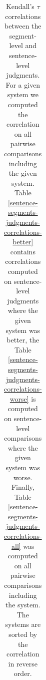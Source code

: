 \begin{table}
\begin{center}
{\begin{tabular}{|l|c|}
          \hline
        \end{tabular}
      \label{sentence-segments-judgments-correlations-worse}
    }
    \,

  \end{center}

  \caption[Correlations between the segment-level judgments and sentence-level
  judgments]{Kendall's $\tau$ correlations between the segment-level and
    sentence-level judgments. For a given system we computed the correlation on
    all pairwise comparisons including the given system. Table
    \ref{sentence-segments-judgments-correlations-better} contains correlations
    computed on sentence-level judgments where the given system was better, the
    Table \ref{sentence-segments-judgments-correlations-worse} is computed on
    sentence-level comparisons where the given system was worse. Finally,
    Table \ref{sentence-segments-judgments-correlations-all} was computed on
    all pairwise comparisons including the system. The systems are sorted by
    the correlation in reverse order.} 

  \label{sentence-segments-judgments-correlations}
\end{table}

